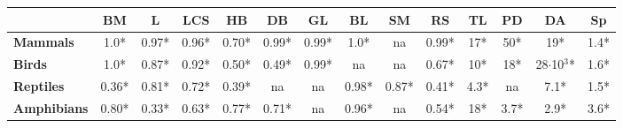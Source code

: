 \begin{table}[h!]
\begin{center}
\begin{tabular}{|l|c|c|c|c|c|c|c|c|c|c|c|c|c|}
\multicolumn{1}{|c|}{}                                & \textbf{BM}    & \textbf{L}   & \textbf{LCS}   & \textbf{HB}   & \textbf{DB}   & \textbf{GL}   & \textbf{BL}   & \textbf{SM}   & \textbf{RS}   & \textbf{TL}           & \textbf{PD}           & \textbf{DA}                & \textbf{Sp}          \\ \hline
\textbf{Mammals}                                      & 1.0*           & 0.97*        & 0.96*          & 0.70*         & 0.99*         & 0.99*         & 1.0*          & na            & 0.99*         & 17*                   & 50*                   & 19*                        & 1.4*                 \\ \hline
\textbf{Birds}                                        & 1.0*           & 0.87*        & 0.92*          & 0.50*         & 0.49*         & 0.99*         & na            & na            & 0.67*         & 10*                   & 18*                   & 28$\cdot$10$^3$*           & 1.6*                 \\ \hline
\textbf{Reptiles}                                     & 0.36*          & 0.81*        & 0.72*          & 0.39*         & na            & na            & 0.98*         & 0.87*         & 0.41*         & 4.3*                  & na                    & 7.1*                       & 1.5*                 \\ \hline
\textbf{Amphibians}                                   & 0.80*          & 0.33*        & 0.63*          & 0.77*         & 0.71*         & na            & 0.96*         & na            & 0.54*         & 18*                   & 3.7*                  & 2.9*                       & 3.6*                 \\ \hline
\end{tabular}
\end{center}
\end{table}

